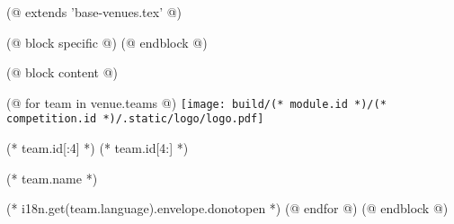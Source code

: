 (@ extends 'base-venues.tex' @)

(@ block specific @)
    \geometry{paper=c5paper, landscape}
(@ endblock @)

(@ block content @)
    \pagestyle{empty}
    \centering

    (@ for team in venue.teams @)
        \texttt{[image: build/(* module.id *)/(* competition.id *)/.static/logo/logo.pdf]}%
        \vspace*{5mm}

        \fontsize{60}{0}\selectfont%
        (* team.id[:4] *)%
        \fontsize{80}{0}\selectfont%
        (* team.id[4:] *)%

        \vspace{5mm}
        \fontsize{15}{0}\selectfont
        (* team.name *)

        \vspace{15mm}
        \normalsize
        (* i18n.get(team.language).envelope.donotopen *)
        \newpage
    (@ endfor @)
(@ endblock @)
